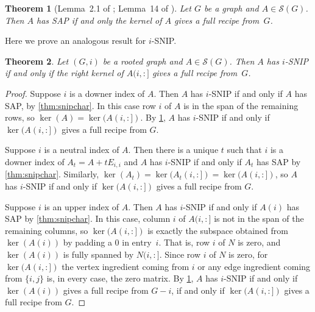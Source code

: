 \documentclass{article}
\newtheorem{theorem}{Theorem}[section]
\theoremstyle{definition}
\newcommand{\mptn}{\mathcal{S}} %
\begin{document}
\begin{theorem}[Lemma~2.1 of \cite{H2010}; Lemma~14 of \cite{ADH2021}]
\label{thm:hein}
Let $G$ be a graph and $A\in\mptn(G)$.  Then $A$ has SAP if and only the kernel of $A$ gives a full recipe from~$G$.
\end{theorem}

Here we prove an analogous result for $i$-SNIP.

\begin{theorem}
\label{thm:nullspace}
Let $(G,i)$ be a rooted graph and $A\in\mptn(G)$.  Then $A$ has $i$-SNIP if and only if  the right kernel of $A(i, :]$ gives a full recipe from~$G$.
\end{theorem}
\begin{proof}
Suppose $i$ is a downer index of $A$.  Then $A$ has $i$-SNIP if and only if $A$ has SAP, by \cref{thm:snipchar}.
In this case row $i$ of $A$ is in the span of the remaining rows, so $\ker(A) = \ker(A(i,:])$.  By \cref{thm:hein}, $A$ has $i$-SNIP if and only if $\ker(A(i,:])$ gives a full recipe from $G$.  

Suppose $i$ is a neutral index of $A$.  Then there is a unique $t$ such that $i$ is a downer index of $A_t = A + tE_{i,i}$ and $A$ has $i$-SNIP if and only if $A_t$ has SAP by \cref{thm:snipchar}.  Similarly, $\ker(A_t) = \ker(A_t(i,:]) = \ker(A(i,:])$, so $A$ has $i$-SNIP if and only if $\ker(A(i,:])$ gives a full recipe from $G$.

Suppose $i$ is an upper index of $A$.  Then $A$ has $i$-SNIP if and only if $A(i)$ has SAP by \cref{thm:snipchar}.  In this case, column $i$ of $A(i,:]$ is not in the span of the remaining columns, so $\ker(A(i,:])$ is exactly the subspace obtained from $\ker(A(i))$ by padding a $0$ in entry~$i$.  That is, row $i$ of $N$ is zero, and $\ker(A(i))$ is fully spanned by $N(i,:]$.  Since row $i$ of $N$ is zero, for $\ker(A(i,:])$ the vertex ingredient coming from $i$ or any edge ingredient coming from $\{i,j\}$ is, in every case, the zero matrix.
By \cref{thm:hein}, $A$ has $i$-SNIP if and only if $\ker(A(i))$ gives a full recipe from $G - i$, if and only if $\ker(A(i,:])$ gives a full recipe from $G$.
\end{proof}

\end{document}
